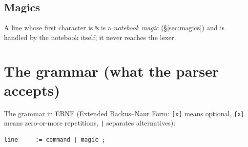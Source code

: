 \documentclass[11pt]{article}
\newcommand{\code}[1]{\texttt{#1}}
\begin{document}
\subsection{Magics}

A line whose first character is \code{\%} is a \emph{notebook magic}
(\S\ref{sec:magics}) and is handled by the notebook itself; it never
reaches the lexer.

\section{The grammar (what the parser accepts)}

The grammar in EBNF (Extended Backus--Naur Form: \code{[x]} means
optional, \code{\{x\}} means zero-or-more repetitions, \code{|} separates
alternatives):

\begin{lstlisting}
line     := command | magic ;


\end{lstlisting}
\end{document}
